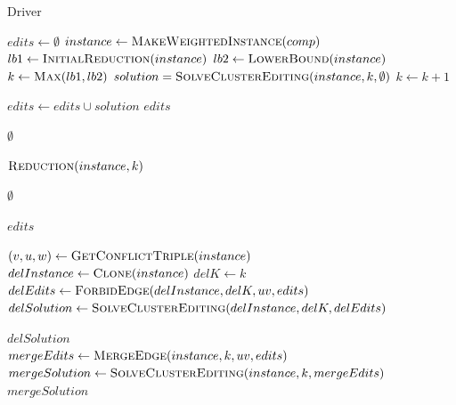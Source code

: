 \documentclass{article}
\theoremstyle{definition}
\begin{document}
\begin{algorithm}{Driver}
\caption{Driver}
\label{alg:driver}
\begin{algorithmic}

	\State $edits \gets \emptyset$
		\State $instance \gets \Call{MakeWeightedInstance}{comp}$
		\State $lb1 \gets \Call{InitialReduction}{instance}$
		\State $lb2 \gets \Call{LowerBound}{instance}$
		\State $k \gets \Call{Max}{lb1, lb2}$
		\Repeat
			\State $solution = \Call{SolveClusterEditing}{instance, k, \emptyset}$
			\State $k \gets k + 1$

		\State $edits \gets edits \cup solution$
	\EndFor
	\State \Return $edits$
\EndFunction

\end{algorithmic}
\end{algorithm}

\begin{algorithm}
\caption{Recursive Solver}
\label{alg:solver}
\begin{algorithmic}

		\State \Return $\emptyset$
	\EndIf

	\State $\Call{Reduction}{instance, k}$

		\State \Return $\emptyset$
	\EndIf

		\State \Return $edits$
	\EndIf

	\State $(v, u, w) \gets \Call{GetConflictTriple}{instance}$
	\\
	\State $delInstance \gets \Call{Clone}{instance}$
	\State $delK \gets k$
	\State $delEdits \gets \Call{ForbidEdge}{delInstance, delK, uv, edits}$
	\State $delSolution \gets \Call{SolveClusterEditing}{delInstance, delK, delEdits}$

		\State \Return $delSolution$
	\EndIf
	\\
	\State $mergeEdits \gets \Call{MergeEdge}{instance, k, uv, edits}$
	\State $mergeSolution \gets \Call{SolveClusterEditing}{instance, k, mergeEdits}$
	\State \Return $mergeSolution$
\EndFunction

\end{algorithmic}
\end{algorithm}
\end{document}
